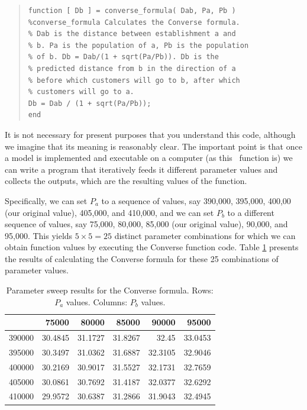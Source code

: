 \begin{quote}
\begin{verbatim}
function [ Db ] = converse_formula( Dab, Pa, Pb )
%converse_formula Calculates the Converse formula.
% Dab is the distance between establishment a and
% b. Pa is the population of a, Pb is the population
% of b. Db = Dab/(1 + sqrt(Pa/Pb)). Db is the
% predicted distance from b in the direction of a
% before which customers will go to b, after which
% customers will go to a.
Db = Dab / (1 + sqrt(Pa/Pb));
end
\end{verbatim}
\end{quote}
It is not necessary for present purposes that you understand this code, although we imagine that its meaning is reasonably clear. The important point is that once a model is implemented and executable on a computer (as this \mlb\ function is) we can write a program that iteratively feeds it different parameter values and collects the outputs, which are the resulting values of the function.

Specifically, we can set $P_a$ to a sequence of values, say 390,000, 395,000, 400,00 (our original value), 405,000, and 410,000, and we can set $P_b$ to a different sequence of values, say 75,000, 80,000, 85,000 (our original value), 90,000, and 95,000. This yields $5\times 5 = 25$ distinct parameter combinations for which we can obtain function values by executing the Converse function code.
Table \ref{table:converse_parameter_sweep} presents the results of calculating the Converse formula for these 25 combinations of parameter values.

\begin{table}[t]
\figtop
\begin{center}
\begin{tabular}{r|rrrrr}
   & 75000 & 80000 & 85000 & 90000 & 95000 \\ \hline
 390000 & 30.4845 & 31.1727 & 31.8267 & 32.45 & 33.0453 \\ 
395000 & 30.3497 & 31.0362 & 31.6887 & 32.3105 & 32.9046 \\ 
400000 & 30.2169 & 30.9017 & 31.5527 & 32.1731 & 32.7659 \\ 
405000 & 30.0861 & 30.7692 & 31.4187 & 32.0377 & 32.6292 \\ 
410000 & 29.9572 & 30.6387 & 31.2866 & 31.9043 & 32.4945 \\ 
\end{tabular}
\end{center}
\caption{Parameter sweep results for the Converse formula. Rows: $P_a$ values. Columns: $P_b$ values.}
\label{table:converse_parameter_sweep}
\figbot
\end{table}

